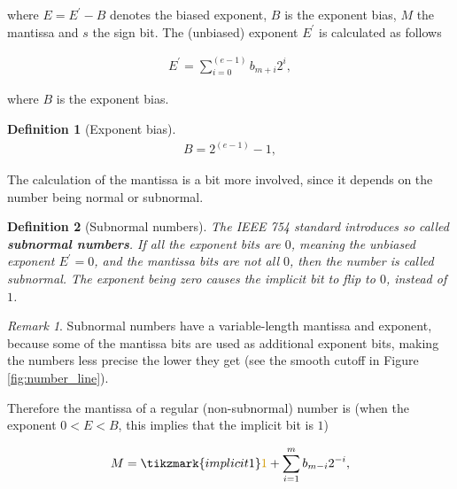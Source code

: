 \documentclass{article}
\theoremstyle{plain} %
\newtheorem{definition}{Definition}[section]
\theoremstyle{convention} %
\theoremstyle{remark} %
\newtheorem*{remark}{Remark} %
\def\df#1{\textbf{\textit{#1}}}
\numberwithin{equation}{section}
\begin{document}
where $E=E^{\prime}-B$ denotes the biased exponent, $B$ is the exponent bias, $M$ the mantissa and $s$ the sign bit. The (unbiased) exponent $E^{\prime}$ is calculated as follows

\begin{align}
    E^{\prime} = \sum_{i=0}^{(e-1)} b_{m+i} 2^i, \label{eq:exponent}
\end{align}

where $B$ is the exponent bias.

\begin{definition}[Exponent bias]

\begin{align*}
    B = 2^{(e-1)} -1,
\end{align*}

\end{definition}

The calculation of the mantissa is a bit more involved, since it depends on the number being normal or subnormal.

\begin{definition}[Subnormal numbers]

The IEEE 754 standard introduces so called \df{subnormal numbers}. If all the exponent bits are $0$, meaning the unbiased exponent $E^{\prime}=0$, and the mantissa bits are not all $0$, then the number is called subnormal. The exponent being zero causes the implicit bit to flip to $0$, instead of $1$.

\end{definition}

\begin{remark}
    Subnormal numbers have a variable-length mantissa and exponent, because some of the mantissa bits are used as additional exponent bits, making the numbers less precise the lower they get (see the smooth cutoff in Figure \ref{fig:number_line}).
\end{remark}

Therefore the mantissa of a regular (non-subnormal) number is (when the exponent $0<E<B$, this implies that the implicit bit is $1$)

\begin{align*}
    M = \tikzmark{implicit1}\textcolor{cyellow}{1} + \sum_{i=1}^{m} b_{m-i} 2^{-i},
\end{align*}

\end{document}

